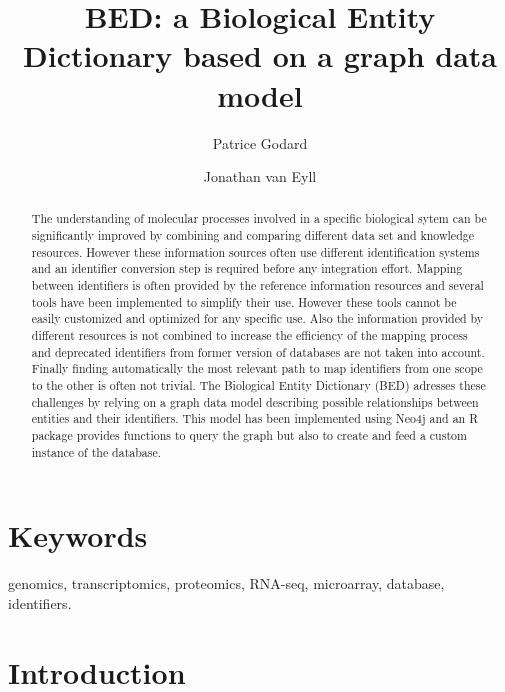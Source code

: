 \documentclass[9pt,a4paper,]{extarticle}
\theoremstyle{definition}
\theoremstyle{definition}
\theoremstyle{definition}
\theoremstyle{remark}
\begin{document}
\pagestyle{front}

\title{BED: a Biological Entity Dictionary based on a graph data model}

\author[1]{Patrice Godard}
\author[2]{Jonathan van Eyll}

\maketitle
\thispagestyle{front}

\begin{abstract}
The understanding of molecular processes involved in a specific biological sytem can be significantly improved by combining and comparing different data set and knowledge resources. However these information sources often use different identification systems and an identifier conversion step is required before any integration effort. Mapping between identifiers is often provided by the reference information resources and several tools have been implemented to simplify their use. However these tools cannot be easily customized and optimized for any specific use. Also the information provided by different resources is not combined to increase the efficiency of the mapping process and deprecated identifiers from former version of databases are not taken into account. Finally finding automatically the most relevant path to map identifiers from one scope to the other is often not trivial. The Biological Entity Dictionary (BED) adresses these challenges by relying on a graph data model describing possible relationships between entities and their identifiers. This model has been implemented using Neo4j and an R package provides functions to query the graph but also to create and feed a custom instance of the database.
\end{abstract}

\section*{Keywords}
genomics, transcriptomics, proteomics, RNA-seq, microarray, database, identifiers.


\clearpage
\pagestyle{main}

\newcommand{\tm}{\textsuperscript{\textregistered}}
\newcommand{\neo}{Neo4j\tm{}}
\newcommand{\cypher}{Cypher\tm{}}
\newcommand{\docker}{Docker\tm{}}
\newcommand{\metabase}{MetaBase\tm{}}

\section{Introduction}\label{introduction}
\end{document}

